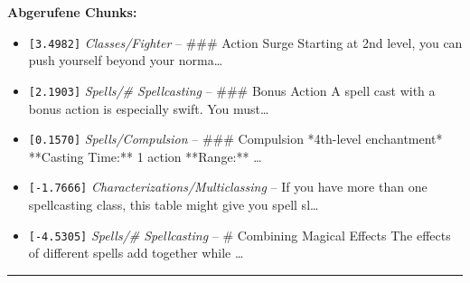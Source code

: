 \noindent\textbf{Abgerufene Chunks:}
\begin{itemize}[noitemsep, topsep=2pt]
  \item[\textbf{\#1}] \texttt{[3.4982]} \textit{Classes/Fighter} -- \#\#\# Action Surge  Starting at 2nd level, you can push yourself beyond your norma\ldots
  \item[\textbf{\#2}] \texttt{[2.1903]} \textit{Spells/# Spellcasting} -- \#\#\# Bonus Action  A spell cast with a bonus action is especially swift. You must\ldots
  \item[\textbf{\#3}] \texttt{[0.1570]} \textit{Spells/Compulsion} -- \#\#\# Compulsion  *4th-level enchantment*  **Casting Time:** 1 action  **Range:** \ldots
  \item[\textbf{\#4}] \texttt{[-1.7666]} \textit{Characterizations/Multiclassing} -- If you have more than one spellcasting class, this table might give you spell sl\ldots
  \item[\textbf{\#5}] \texttt{[-4.5305]} \textit{Spells/# Spellcasting} -- \# Combining Magical Effects  The effects of different spells add together while \ldots
\end{itemize}
\vspace{4pt}
\hrule
\vspace{6pt}
